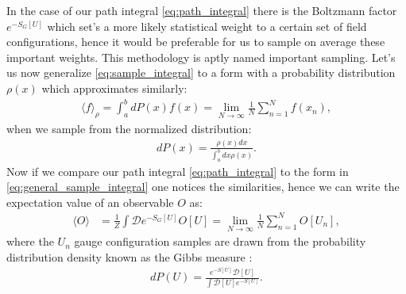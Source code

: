 \documentclass[english,twoside,openright]{UH_TCM_MSc}
\begin{document}
In the case of our path integral \ref{eq:path_integral} there is the Boltzmann factor $e^{-S_G[U]}$ which set's a more likely statistical weight to a certain set of field configurations, hence it would be preferable for us to sample on average these important weights. This methodology is aptly named important sampling. Let's us now generalize \ref{eq:sample_integral} to a form with a probability distribution $\rho(x)$ which approximates similarly:
\begin{align}
    \langle f \rangle_{\rho} = \int_a^b dP(x) f(x) = \lim_{N\rightarrow \infty}\frac{1}{N}\sum_{n=1}^N f(x_n), \label{eq:general_sample_integral}
\end{align}
when we sample from the normalized distribution:
\begin{align}
    dP(x) = \frac{\rho(x)dx}{\int_a^b dx \rho(x)}.
\end{align}
Now if we compare our path integral \ref{eq:path_integral} to the form in \ref{eq:general_sample_integral} one notices the similarities, hence we can write the expectation value of an observable $O$ as:
\begin{align}
    \langle O \rangle &= \frac{1}{Z}\int \mathcal{D}e^{-S_G[U]}O[U] = \lim_{N\rightarrow \infty}\frac{1}{N}\sum_{n=1}^N O[U_n], \label{eq:observable}
\end{align}
where the $U_n$ gauge configuration samples are drawn from the probability distribution density known as the Gibbs measure \cite{Georgii+2011}:
\begin{align}
    dP(U) = \frac{e^{-S[U]}\mathcal{D}[U]}{\int \mathcal{D}[U]e^{-S[U]}}.
\end{align}
\end{document}
